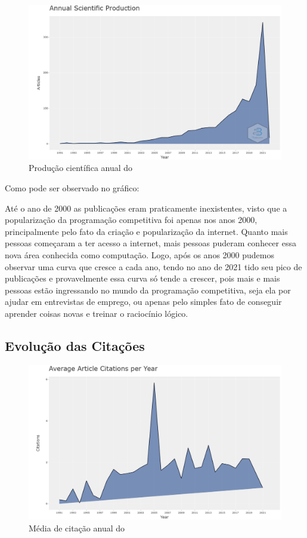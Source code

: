 \begin{figure}[ht]
    \centering
    \includegraphics[width=12cm]{experiments/enzoyoshio/AnaliseBibliometrica/anualScientificProduction.png}
    \caption{ Produção científica anual do \dataset\ }
    \label{fig:evoEnzoYoshio}
\end{figure}

Como pode ser observado no gráfico:

Até o ano de 2000 as publicações eram praticamente inexistentes, visto que a popularização da programação competitiva foi apenas nos anos 2000, principalmente pelo fato da criação e popularização da internet. Quanto mais pessoas começaram a ter acesso a internet, mais pessoas puderam conhecer essa nova área conhecida como computação. Logo, após os anos 2000 pudemos observar uma curva que cresce a cada ano, tendo no ano de 2021 tido seu pico de publicações e provavelmente essa curva só tende a crescer, pois mais e mais pessoas estão ingressando no mundo da programação competitiva, seja ela por ajudar em entrevistas de emprego, ou apenas pelo simples fato de conseguir aprender coisas novas e treinar o raciocínio lógico. 

\subsection{Evolução das Citações}

\begin{figure}[ht]
    \centering
    \includegraphics[width=12cm]{experiments/enzoyoshio/AnaliseBibliometrica/averageCitationPerYear.png}
    \caption{ Média de citação anual do \dataset\ }
    \label{fig:citaEnzoYoshio}
\end{figure}

